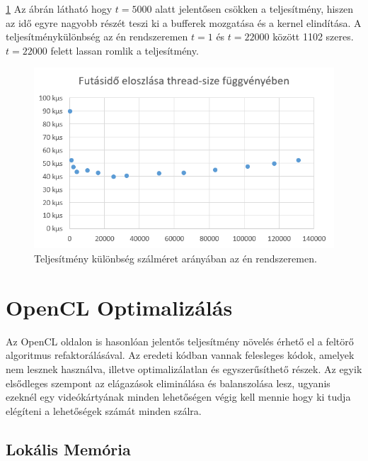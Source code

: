 \ref{fig:threadsize-performance} Az ábrán látható hogy $t = \num{5000}$ alatt jelentősen csökken a teljesítmény, hiszen az idő egyre nagyobb részét teszi ki a bufferek mozgatása és a kernel elindítása. A teljesítménykülönbség az én rendszeremen $t = \num{1}$ és $t = \num{22000}$ között 1102 szeres. $t = \num{22000}$ felett lassan romlik a teljesítmény.

\begin{figure}[h]
    \centering
    \includegraphics[width=\textwidth]{images/charts/thread-size-performance.png}
    \caption{Teljesítmény különbség szálméret arányában az én rendszeremen.}
    \label{fig:threadsize-performance}
\end{figure}




\section{OpenCL Optimalizálás}

Az OpenCL oldalon is hasonlóan jelentős teljesítmény növelés érhető el a feltörő algoritmus refaktorálásával. Az eredeti kódban vannak felesleges kódok, amelyek nem lesznek használva, illetve optimalizálatlan és egyszerűsíthető részek. Az egyik elsődleges szempont az elágazások eliminálása és balanszolása lesz, ugyanis ezeknél egy videókártyának minden lehetőségen végig kell mennie hogy ki tudja elégíteni a lehetőségek számát minden szálra. 




\subsection{Lokális Memória}

